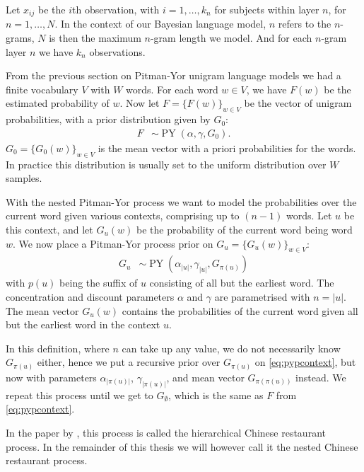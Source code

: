 Let $x_{ij}$ be the $i$th observation, with $i = 1,\ldots,k_n$ for subjects within layer $n$, for $n=1,\ldots,N$. In the context of our Bayesian language model, $n$ refers to the $n$-grams, $N$ is then the maximum $n$-gram length we model. And for each $n$-gram layer $n$ we have $k_n$ observations.

From the previous section on Pitman-Yor unigram language models we had a finite vocabulary $V$ with $W$ words. For each word $w\in V$, we have $F(w)$ be the estimated probability of $w$. Now let $F=\{F(w)\}_{w\in V}$ be the vector of unigram probabilities, with a prior distribution given by $G_0$: 
\begin{align}\label{eq:pypcontext}
	F&\sim\operatorname{PY}(\alpha, \gamma, G_0).
\end{align}
$G_0=\{G_0(w)\}_{w\in V}$ is the mean vector with a priori probabilities for the words. In practice this distribution is usually set to the uniform distribution over $W$ samples. 

With the nested Pitman-Yor process we want to model the probabilities over the current word given various contexts, comprising up to $(n-1)$ words. Let $u$ be this context, and let $G_u(w)$ be the probability of the current word being word $w$. We now place a Pitman-Yor process prior on $G_u = \{G_u(w)\}_{w\in V}$:
\begin{align}\label{eq:npypcontext}
	G_u&\sim\operatorname{PY}(\alpha_{|u|},\gamma_{|u|},G_{\pi(u)})
\end{align}
with $p(u)$ being the suffix of $u$ consisting of all but the earliest word. The concentration and discount parameters $\alpha$ and $\gamma$ are parametrised with $n = |u|$. The mean vector $G_u(w)$ contains the probabilities of the current word given all but the earliest word in the context $u$.

In this definition, where $n$ can take up any value, we do not necessarily know $G_{\pi(u)}$ either, hence we put a recursive prior over $G_{\pi(u)}$ on \cref{eq:pypcontext}, but now with parameters $\alpha_{|\pi(u)|}$, $\gamma_{|\pi(u)|}$, and mean vector $G_{\pi(\pi(u))}$ instead. We repeat this process until we get to $G_\emptyset$, which is the same as $F$ from \cref{eq:pypcontext}.

In the paper by \textcite{Teh2006A}, this process is called the hierarchical Chinese restaurant process. In the remainder of this thesis we will however call it the nested Chinese restaurant process. 

